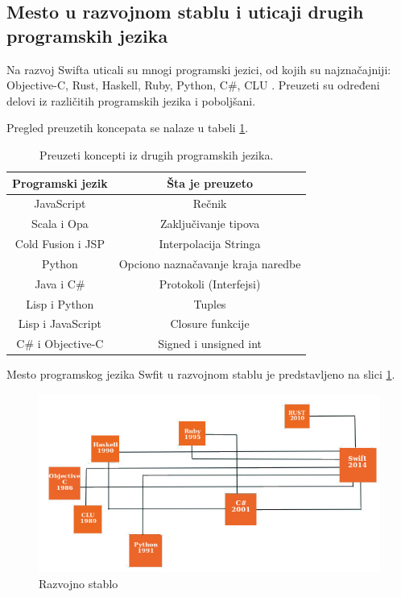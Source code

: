 \documentclass[a4paper]{article}
\begin{document}
\subsection{Mesto u razvojnom stablu i uticaji drugih programskih jezika}
\label{subsec:podnaslov6}
Na razvoj Swifta uticali su mnogi programski jezici, od kojih su najznačajniji: Objective-C, Rust, Haskell, Ruby, Python, C\#, CLU \cite{chris_sajt}. Preuzeti su određeni delovi iz različitih programskih jezika i poboljšani.

Pregled preuzetih koncepata se nalaze u tabeli \ref{tab:tabela2}.

\newpage

\begin{table}[h!]
\begin{center}
\caption{Preuzeti koncepti iz drugih programskih jezika.}
\begin{tabular}{|c|c|} \hline
\label{tab:tabela2}
Programski jezik & Šta je preuzeto \\ \hline
JavaScript & Rečnik  \\ \hline
Scala i Opa & Zaključivanje tipova \\ \hline
Cold Fusion i JSP & Interpolacija Stringa \\ \hline
Python & Opciono naznačavanje kraja naredbe \\ \hline
Java i C\# & Protokoli (Interfejsi) \\ \hline
Lisp i Python & Tuples \\ \hline
Lisp i JavaScript &  Closure funkcije \\ \hline
C\# i Objective-C & Signed i unsigned int \\ \hline
\end{tabular}
\end{center}
\end{table}

Mesto programskog jezika Swfit u razvojnom stablu je predstavljeno na slici \ref{fig:razvojno_stablo}.

\begin{figure}[h!]
\begin{center}
\includegraphics[scale=0.7]{razvojno_stablo.jpg}
\end{center}
\caption{Razvojno stablo}
\label{fig:razvojno_stablo}
\end{figure}
\end{document}
